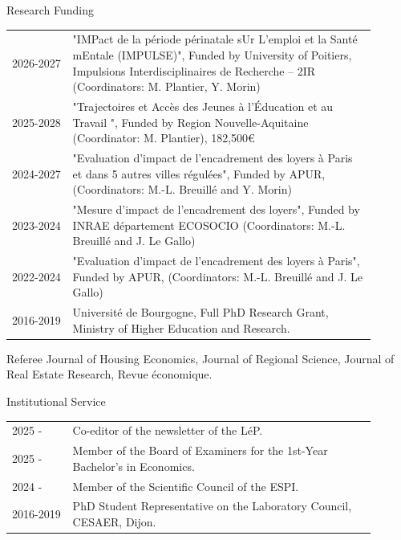 \documentclass{resume} %
\begin{document}
\begin{rSection}{Research Funding}
\begin{table}[H]
{\def\arraystretch{1.5}\tabcolsep=0pt
\begin{tabular}{p{0.15\linewidth}p{0.75\linewidth}}
2026-2027 & "IMPact de la période périnatale sUr L'emploi et la Santé mEntale (IMPULSE)", Funded by University of Poitiers, Impulsions Interdisciplinaires de Recherche – 2IR (Coordinators: M. Plantier, Y. Morin) \\
2025-2028 & "Trajectoires et Accès des Jeunes à l’Éducation et au Travail ", Funded by Region Nouvelle-Aquitaine (Coordinator: M. Plantier), 182,500\euro \\
2024-2027 & "Evaluation d’impact de l’encadrement des loyers à Paris et dans 5 autres villes régulées", Funded by APUR, (Coordinators: M.-L. Breuillé and Y. Morin)  \\
2023-2024 & "Mesure d’impact de l’encadrement des loyers", Funded by INRAE département ECOSOCIO (Coordinators: M.-L. Breuillé and J. Le Gallo) \\
2022-2024 & "Evaluation d’impact de l’encadrement des loyers à Paris", Funded by APUR, (Coordinators: M.-L. Breuillé and J. Le Gallo) \\
2016-2019 & Université de Bourgogne, Full PhD Research Grant, Ministry of Higher Education and Research.\\
\end{tabular}%
}
\end{table}
\end{rSection}
\begin{rSection}{Referee}
Journal of Housing Economics, Journal of Regional Science, Journal of Real Estate Research, Revue économique.
\end{rSection}
\begin{rSection}{Institutional Service}
{\def\arraystretch{1.5}\tabcolsep=0pt
\begin{tabular}{p{0.15\linewidth}p{0.75\linewidth}}
2025 - & Co-editor of the newsletter of the LéP.\\
2025 - & Member of the Board of Examiners for the 1st-Year Bachelor's in Economics.\\
2024 - & Member of the Scientific Council of the ESPI.\\
2016-2019 & PhD Student Representative on the Laboratory Council, CESAER, Dijon. \\
\end{tabular}%
}
\end{rSection}
\end{document}
